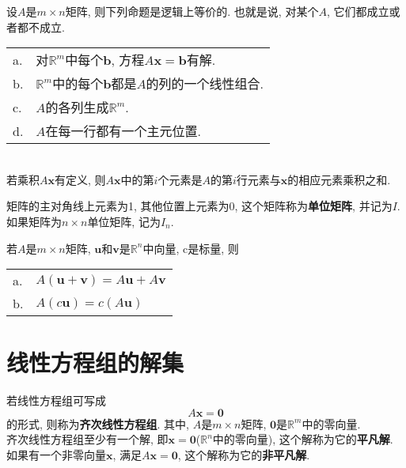 \begin{TheoremOne}
设$A$是$m\times n$矩阵, 则下列命题是逻辑上等价的. 也就是说, 对某个$A$, 它们都成立或者都不成立.\\
\begin{tabular}{l@{\,}l}
a. & 对$\mathbb{R}^m$中每个$\bm{b}$, 方程$A\bm{x}=\bm{b}$有解.\\
b. & $\mathbb{R}^m$中的每个$\bm{b}$都是$A$的列的一个线性组合.\\
c. & $A$的各列生成$\mathbb{R}^m$.\\
d. & $A$在每一行都有一个主元位置.\\[2ex]
\end{tabular}
\end{TheoremOne}\vspace{2ex}

\begin{law}[计算$A\bm{x}$的行---向量规则]\ \\
若乘积$A\bm{x}$有定义, 则$A\bm{x}$中的第$i$个元素是$A$的第$i$行元素与$\bm{x}$的相应元素乘积之和.
\end{law}\vspace{2ex}

矩阵的主对角线上元素为1, 其他位置上元素为0, 这个矩阵称为\textbf{单位矩阵}, 并记为$I$.\\
如果矩阵为$n\times n$单位矩阵, 记为$I_n$.\\[2ex]

\begin{TheoremOne}
若$A$是$m\times n$矩阵, $\bm{u}$和$\bm{v}$是$\mathbb{R}^n$中向量, c是标量, 则\\
\begin{tabular}{l@{\,}l}
a. & $A(\bm{u}+\bm{v})=A\bm{u}+A\bm{v}$\\
b. & $A(c\bm{u})=c(A\bm{u})$
\end{tabular}
\end{TheoremOne}\vspace{6ex}

\section{线性方程组的解集}
若线性方程组可写成
\[A\bm{x}=\bm{0}\]
的形式, 则称为\textbf{齐次线性方程组}. 其中, $A$是$m\times n$矩阵, $\bm{0}$是$\mathbb{R}^m$中的零向量.\\
齐次线性方程组至少有一个解, 即$\bm{x}=\bm{0}$($\mathbb{R}^n$中的零向量), 这个解称为它的\textbf{平凡解}.\\
如果有一个非零向量$\bm{x}$, 满足$A\bm{x}=\bm{0}$, 这个解称为它的\textbf{非平凡解}.\\[2ex]

